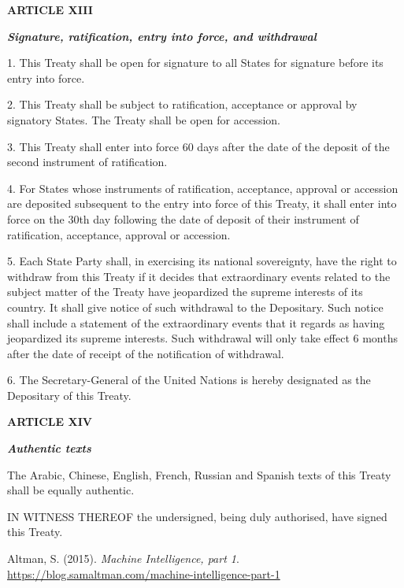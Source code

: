 \documentclass[12pt,a4paper]{article}
\begin{document}
\begin{center}

\textbf{{ARTICLE XIII}}

\textbf{\textit{Signature, ratification, entry into force, and withdrawal}}
\end{center}

1. This Treaty shall be open for signature to all States for signature before its entry into force. 

2. This Treaty shall be subject to ratification, acceptance or approval by signatory States. The Treaty shall be open for accession.

3. This Treaty shall enter into force 60 days after the date of the deposit of the second instrument of ratification. 

4. For States whose instruments of ratification, acceptance, approval or accession are deposited subsequent to the entry into force of this Treaty, it shall enter into force on the 30th day following the date of deposit of their instrument of ratification, acceptance, approval or accession.

5. Each State Party shall, in exercising its national sovereignty, have the right to withdraw from this Treaty if it decides that extraordinary events related to the subject matter of the Treaty have jeopardized the supreme interests of its country. It shall give notice of such withdrawal to the Depositary. Such notice shall include a statement of the extraordinary events that it regards as having jeopardized its supreme interests. Such withdrawal will only take effect 6 months after the date of receipt of the notification of withdrawal. 

6. The Secretary-General of the United Nations is hereby designated as the Depositary of this Treaty.

\begin{center}

\textbf{{ARTICLE XIV}}

\textbf{\textit{Authentic texts}}
\end{center}
The Arabic, Chinese, English, French, Russian and Spanish texts of this Treaty shall be equally authentic.

IN WITNESS THEREOF the undersigned, being duly authorised, have signed this Treaty.

\newpage


\sloppy

Altman, S. (2015). \textit{Machine Intelligence, part 1}. \url{https://blog.samaltman.com/machine-intelligence-part-1}
\end{document}
